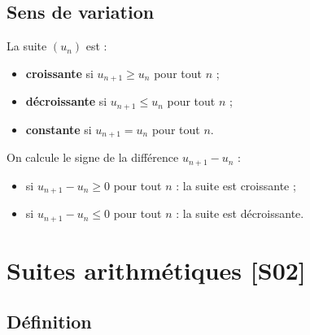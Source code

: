 \documentclass[a4paper,11pt]{article}
\begin{document}
\begin{center}
\end{center}

\subsection{Sens de variation}

\begin{definition}
La suite $(u_n)$ est :
\begin{itemize}
  \item \textbf{croissante} si $u_{n+1} \geq u_n$ pour tout $n$ ;
  \item \textbf{décroissante} si $u_{n+1} \leq u_n$ pour tout $n$ ;
  \item \textbf{constante} si $u_{n+1} = u_n$ pour tout $n$.
\end{itemize}
\end{definition}

\begin{methode}
On calcule le signe de la différence $u_{n+1} - u_n$ :
\begin{itemize}
  \item si $u_{n+1} - u_n \geq 0$ pour tout $n$ : la suite est croissante ;
  \item si $u_{n+1} - u_n \leq 0$ pour tout $n$ : la suite est décroissante.
\end{itemize}
\end{methode}

\newpage
\section{Suites arithmétiques \hfill {\normalsize\color{uimmred}[S02]}}

\subsection{Définition}
\end{document}
